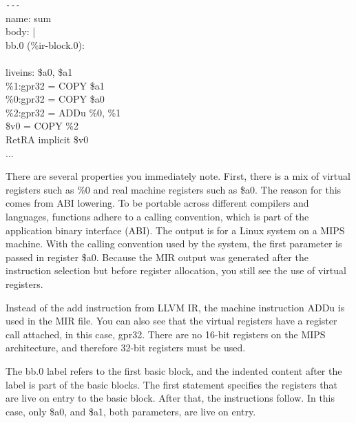 \begin{tcolorbox}[colback=white,colframe=black]
\verb|---| \\
name: \hspace{3cm}sum \\
body: \hspace{3cm}| \\
\hspace*{0.5cm}bb.0 (\%ir-block.0): \\
\\
\hspace*{0.5cm}liveins: \$a0, \$a1 \\
\hspace*{0.5cm}\%1:gpr32 = COPY \$a1 \\
\hspace*{0.5cm}\%0:gpr32 = COPY \$a0 \\
\hspace*{0.5cm}\%2:gpr32 = ADDu \%0, \%1 \\
\hspace*{0.5cm}\$v0 = COPY \%2 \\
\hspace*{0.5cm}RetRA implicit \$v0 \\
... 

\end{tcolorbox}

There are several properties you immediately note. First, there is a mix of virtual registers such as \%0 and real machine registers such as \$a0. The reason for this comes from ABI lowering. To be portable across different compilers and languages, functions adhere to a calling convention, which is part of the application binary interface (ABI). The output is for a Linux system on a MIPS machine. With the calling convention used by the system, the first parameter is passed in register \$a0. Because the MIR output was generated after the instruction selection but before register allocation, you still see the use of virtual registers.\par

Instead of the add instruction from LLVM IR, the machine instruction ADDu is used in the MIR file. You can also see that the virtual registers have a register call attached, in this case, gpr32. There are no 16-bit registers on the MIPS architecture, and therefore 32-bit registers must be used.\par

The bb.0 label refers to the first basic block, and the indented content after the label is part of the basic blocks. The first statement specifies the registers that are live on entry to the basic block. After that, the instructions follow. In this case, only \$a0, and \$a1, both parameters, are live on entry.\par

